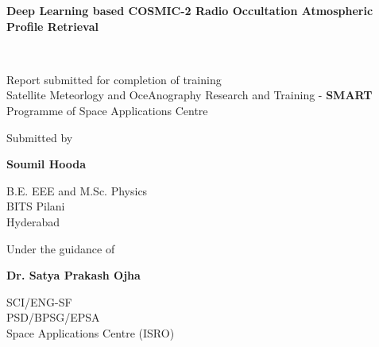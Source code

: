 \documentclass[a4paper,12pt,twoside]{article}
\begin{document}
\pagestyle{empty} 
\begin{center}
{\Large \bf  Deep Learning based COSMIC-2 Radio Occultation Atmospheric Profile Retrieval}
\end{center}
\vspace{0.5cm}
\begin{center}
\\
\end{center}
\begin{center}
Report submitted for completion of training \\
Satellite Meteorlogy and OceAnography Research and Training - \textbf{SMART} \\
Programme of Space Applications Centre
\end{center}
\vspace{0.5cm}
\begin{multicols}{2}
\begin{center}
	Submitted by \\
	\begin{large}
		\textbf{Soumil Hooda} \\
	\end{large}
	B.E. EEE and M.Sc. Physics \\
	BITS Pilani\\
	 Hyderabad \\
\end{center} 

\begin{center}
	Under the guidance of \\
	\begin{large}
		\textbf{Dr. Satya Prakash Ojha} \\
	\end{large}
	SCI/ENG-SF \\
	PSD/BPSG/EPSA\\
	Space Applications Centre (ISRO) \\
\end{center}

\end{multicols}
\end{document}
